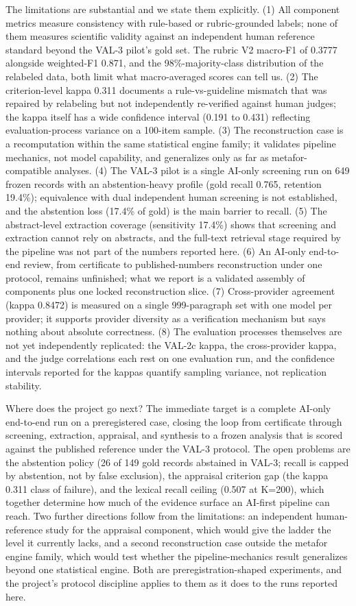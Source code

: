 \documentclass[
]{article}
\newcounter{none} %
\begin{document}
The limitations are substantial and we state them explicitly. (1) All
component metrics measure consistency with rule-based or rubric-grounded
labels; none of them measures scientific validity against an independent
human reference standard beyond the VAL-3 pilot's gold set. The rubric
V2 macro-F1 of 0.3777 alongside weighted-F1 0.871, and the
98\%-majority-class distribution of the relabeled data, both limit what
macro-averaged scores can tell us. (2) The criterion-level kappa 0.311
documents a rule-vs-guideline mismatch that was repaired by relabeling
but not independently re-verified against human judges; the kappa itself
has a wide confidence interval (0.191 to 0.431) reflecting
evaluation-process variance on a 100-item sample. (3) The reconstruction
case is a recomputation within the same statistical engine family; it
validates pipeline mechanics, not model capability, and generalizes only
as far as metafor-compatible analyses. (4) The VAL-3 pilot is a single
AI-only screening run on 649 frozen records with an abstention-heavy
profile (gold recall 0.765, retention 19.4\%); equivalence with dual
independent human screening is not established, and the abstention loss
(17.4\% of gold) is the main barrier to recall. (5) The abstract-level
extraction coverage (sensitivity 17.4\%) shows that screening and
extraction cannot rely on abstracts, and the full-text retrieval stage
required by the pipeline was not part of the numbers reported here. (6)
An AI-only end-to-end review, from certificate to published-numbers
reconstruction under one protocol, remains unfinished; what we report is
a validated assembly of components plus one locked reconstruction slice.
(7) Cross-provider agreement (kappa 0.8472) is measured on a single
999-paragraph set with one model per provider; it supports provider
diversity as a verification mechanism but says nothing about absolute
correctness. (8) The evaluation processes themselves are not yet
independently replicated: the VAL-2c kappa, the cross-provider kappa,
and the judge correlations each rest on one evaluation run, and the
confidence intervals reported for the kappas quantify sampling variance,
not replication stability.

Where does the project go next? The immediate target is a complete
AI-only end-to-end run on a preregistered case, closing the loop from
certificate through screening, extraction, appraisal, and synthesis to a
frozen analysis that is scored against the published reference under the
VAL-3 protocol. The open problems are the abstention policy (26 of 149
gold records abstained in VAL-3; recall is capped by abstention, not by
false exclusion), the appraisal criterion gap (the kappa 0.311 class of
failure), and the lexical recall ceiling (0.507 at K=200), which
together determine how much of the evidence surface an AI-first pipeline
can reach. Two further directions follow from the limitations: an
independent human-reference study for the appraisal component, which
would give the ladder the level it currently lacks, and a second
reconstruction case outside the metafor engine family, which would test
whether the pipeline-mechanics result generalizes beyond one statistical
engine. Both are preregistration-shaped experiments, and the project's
protocol discipline applies to them as it does to the runs reported
here.
\end{document}
